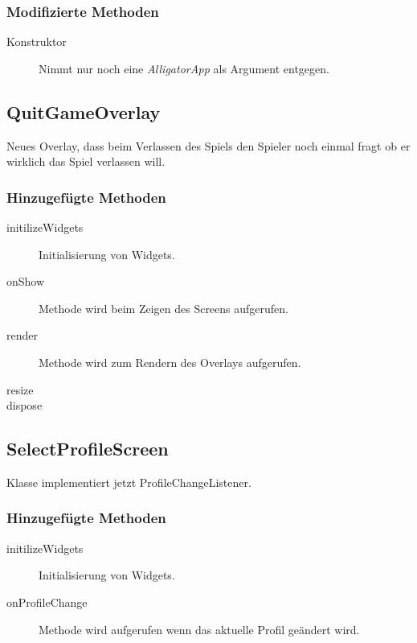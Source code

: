 \subsubsection{Modifizierte Methoden}
\begin{description}
\item[Konstruktor]
Nimmt nur noch eine \emph{AlligatorApp} als Argument entgegen.

\end{description}




\subsection{QuitGameOverlay}
Neues Overlay, dass beim Verlassen des Spiels den Spieler noch einmal fragt ob er wirklich das Spiel verlassen will.

\subsubsection{Hinzugefügte Methoden}
\begin{description}
\item[initilizeWidgets]
Initialisierung von Widgets.
\item[onShow]
Methode wird beim Zeigen des Screens aufgerufen.
\item[render]
Methode wird zum Rendern des Overlays aufgerufen.
\item[resize]
\item[dispose]
\end{description}


\subsection{SelectProfileScreen}
Klasse implementiert jetzt ProfileChangeListener.
\subsubsection{Hinzugefügte Methoden}
\begin{description}
\item[initilizeWidgets]
Initialisierung von Widgets.
\item[onProfileChange]
Methode wird aufgerufen wenn das aktuelle Profil geändert wird.

\end{description}

